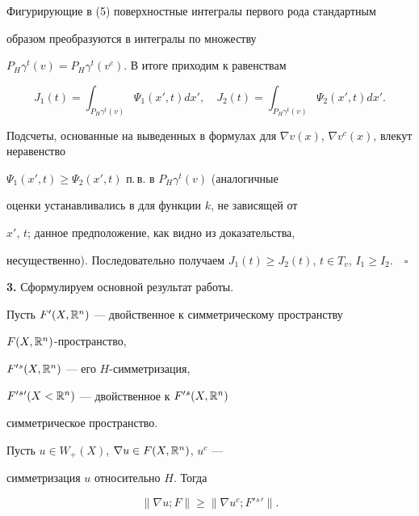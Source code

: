 Фигурирующие в (5) поверхностные интегралы первого рода стандартным 


образом преобразуются в интегралы по множеству 


$P_H\gamma^t(v)=P_H\gamma^t(v^c)$. В итоге приходим к равенствам 


$$ 


J_1(t)=\int_{P_H\gamma^t(v)}\Psi_1(x',t)d x',\quad 


J_2(t)=\int_{P_H\gamma^t(v)}\Psi_2(x',t)d x'. 


$$ 


Подсчеты, основанные на выведенных в \cite{8} формулах для $\nabla 


v(x)$, $\nabla v^c(x)$, влекут неравенство 


$\Psi_1(x',t)\ge\Psi_2(x',t)$ п.\,в. в $P_H\gamma^t(v)$ (аналогичные 


оценки устанавливались в \cite{8} для функции $k$, не зависящей от 


$x'$, $t$; данное предположение, как видно из доказательства, 


несущественно). Последовательно получаем $J_1(t)\ge J_2(t)$, $t\in 


T_v$, $I_1\ge I_2$.$\quad\square$ 


\medskip 


 


{\bf 3.} Сформулируем основной результат работы. 


 


\begin{thm} 


Пусть $F'(X,\Bbb R^n)$ --- двойственное к симметрическому пространству


$F(X,\Bbb R^n)$-пространство,


$F{}'{}^s(X,\Bbb R^n)$ --- его $H$-симметризация, 


$F{}'{}^s{}'(X<\Bbb R^n)$ --- двойственное к $F{}'{}^s(X,\Bbb R^n)$


симметрическое пространство. 


Пусть $u\in W_+(X)$, $\nabla u\in F(X,\Bbb R^n)$, $u^c$ --- 


симметризация $u$ относительно $H$. Тогда 


\begin{equation} 


\|\nabla u;F\|\ge\|\nabla u^c;F{}'{}^s{}'\|. 


\end{equation} 


\end{thm} 


